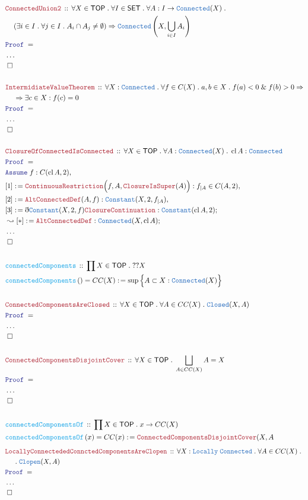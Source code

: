 \documentclass[12pt]{scrartcl}
\newcommand{\TYPE}[1]{\textcolor{NavyBlue}{\mathtt{#1}}}
\newcommand{\FUNC}[1]{\textcolor{Cerulean}{\mathtt{#1}}}
\newcommand{\LOGIC}[1]{\textcolor{Blue}{\mathtt{#1}}}
\newcommand{\THM}[1]{\textcolor{Maroon}{\mathtt{#1}}}
\renewcommand{\.}{\; . \;}
\newcommand{\de}{: \kern 0.1pc =}
\newcommand{\Act}[1]{\left( #1 \right)}
\newcommand{\Theorem}[2]{& \THM{#1} \, :: \, #2 \\ & \Proof = \\ }
\newcommand{\DeclareFunc}[2]{& \FUNC{#1} \, :: \, #2 \\}
\newcommand{\DefineNamedFunc}[4]{&  \FUNC{#1}\Act{#2} = #3 \de #4 \\}
\newcommand{\NewLine}{\\ & \kern 1pc}
\newcommand{\Page}[1]{ \begin{align*} #1 \end{align*}   }
\newcommand{ \bd }{ \ByDef }
\newcommand{\NoProof}{ & \ldots \\ \EndProof}
\renewcommand{\And}{\; \& \;}
\newcommand{\Imply}{\Rightarrow}
\newcommand{\Say}[3]{& #1 \de #2 : #3, \\}
\newcommand{\Conclude}[3]{& #1 \de #2 : #3; \\}
\newcommand{\DeriveConclude}[3]{& \leadsto #1 \de #2 : #3 ; \\}
\newcommand{\Assume}[2]{& \LOGIC{Assume} \; #1 : #2, \\}
\newcommand{\QED}{\; \square}
\newcommand{\EndProof}{& \QED \\}
\newcommand{\ByDef}{\eth}
\newcommand{\Proof}{\LOGIC{Proof} \; }
\newcommand{\SET}{\mathsf{SET}}
\DeclareMathOperator*{\cl}{cl}
\newcommand{\TOP}{\mathsf{TOP}}
\begin{document}
\Page{
	\Theorem{ConnectedUnion2}{\forall X \in \TOP \. \forall I \in \SET \. \forall A : I \to \TYPE{Connected}(X) \. \NewLine (\exists i \in I \. \forall j \in I \. A_i \cap A_j \neq \emptyset ) \Imply \TYPE{Connected}\left(X,\bigcup_{i \in I} A_i \right)}
	\NoProof
	\\
	\Theorem{IntermidiateValueTheorem}{\forall X : \TYPE{Connected} \.  \forall f  \in C(X) \. a,b \in X \. f(a) < 0 \And f(b) > 0 \Imply \NewLine \Imply \exists c \in X : f(c) = 0 }
	\NoProof
	\\
	\Theorem{ClosureOfConnectedIsConnected}{\forall X \in \TOP \. \forall A : \TYPE{Connected}(X) \. \cl A : \TYPE{Connected} }
	\Assume{f}{C(\cl A, 2)}
	\Say{[1]}{\THM{ContinuousRestriction}\Big(f,A,\THM{ClosureIsSuper}(A)\Big)}{f_{|A} \in C(A, 2) }
	\Say{[2]}{\THM{AltConnectedDef}(A,f)}{ \TYPE{Constant}(X,2,f_{|A})}
	\Conclude{[3]}{\bd \TYPE{Constant}(X,2,f)\THM{ClosureContinuation}}{\TYPE{Constant}(\cl A,2)}
	\DeriveConclude{[*]}{\THM{AltConnectedDef}}{\TYPE{Connected}(X,\cl A)}
	\NoProof
	\\
	\DeclareFunc{connectedComponents}{\prod X \in \TOP \. ??X}
	\DefineNamedFunc{connectedComponents}{}{CC(X)}{\sup \Big\{  A \subset X : \TYPE{Connected}(X)   \Big\}}
	\\
	\Theorem{ConnectedComponentsAreClosed}{\forall X \in \TOP \.  \forall A \in CC(X) \. \TYPE{Closed}(X,A)}
	\NoProof
	\\
	\Theorem{ConnectedComponentsDisjointCover}{\forall X \in \TOP \. \bigsqcup_{A \in CC(X)} A = X}
	\NoProof
	\\
	\DeclareFunc{connectedComponentsOf}{\prod X \in \TOP \. x \to  CC(X)}
	\DefineNamedFunc{connectedComponentsOf}{x}{CC(x)}{\THM{ConnectedComponentsDisjointCover}(X,A}
}
\Page{
	\Theorem{LocallyConnectededConnctedComponentsAreClopen}{\forall X : \TYPE{Locally}\;\TYPE{Connected} \. \forall A \in CC(X) \. \NewLine \. \TYPE{Clopen}(X,A)}
	\NoProof
}
\newpage
\end{document}
